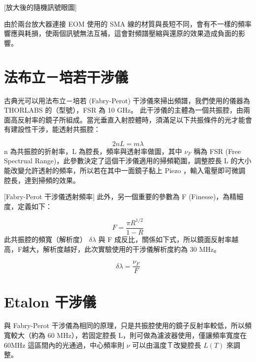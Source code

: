 \documentclass[class=NCU_thesis, crop=false]{standalone}
\begin{document}
[放大後的隨機訊號眼圖]

由於兩台放大器連接 EOM 使用的 SMA 線的材質與長短不同，會有不一樣的頻率響應與耗損，使兩個訊號無法互補，這會對頻譜壓縮與還原的效果造成負面的影響。

\section{法布立－培若干涉儀}
古典光可以用法布立－培若 (Fabry-Perot) 干涉儀來掃出頻譜，我們使用的儀器為 THORLABS 的（型號），FSR 為 10 GHz。
此干涉儀的主體為一個共振腔，由兩面高反射率的鏡子所組成。當光垂直入射腔體時，須滿足以下共振條件的光才能會有建設性干涉，能透射共振腔：

\begin{equation}
    2nL=m\lambda
\end{equation}
n 為共振腔的折射率，L 為腔長，頻率與透射率做圖，其中 $\nu_{F}$ 稱為 FSR (Free Spectrual Range)，此參數決定了這個干涉儀適用的掃頻範圍，調整腔長 L 的大小能改變允許透射的頻率，所以若在其中一面鏡子黏上 Piezo ，輸入電壓即可微調腔長，達到掃頻的效果。

[Fabry-Perot 干涉儀透射頻率]
此外，另一個重要的參數為 F (Finesse)，為精細度，定義如下：

\begin{equation}
    F=\frac{\pi R^{1/2}}{1-R}
\end{equation}
此共振腔的頻寬（解析度） $\delta \lambda$ 與 F 成反比，關係如下式，所以鏡面反射率越高，F越大，解析度越好，此次實驗使用的干涉儀解析度約為 30 MHz。

\begin{equation}
    \delta \lambda=\frac{\nu_{F}}{F}
\end{equation}

\section{Etalon 干涉儀}
與 Fabry-Perot 干涉儀為相同的原理，只是共振腔使用的鏡子反射率較低，所以頻寬較大（約為 60 MHz），若固定腔長 L，則可做為濾波器使用，僅讓頻率寬度在 60MHz 這區間內的光通過，中心頻率則 $\nu$ 可以由溫度Ｔ改變腔長 $L(T)$ 來調整。
\end{document}
